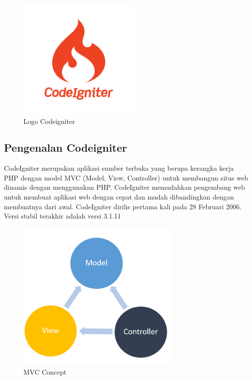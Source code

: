 \begin{enumerate}
\begin{itemize}
\end{itemize}

	\begin{figure}[H]
		\includegraphics[width=6cm]{figures/web/logocodeigniter.png}
		\centering
		\caption{Logo Codeigniter}
	\end{figure}

\subsection{Pengenalan Codeigniter}

CodeIgniter merupakan aplikasi sumber terbuka yang berupa kerangka kerja PHP dengan model MVC (Model, View, Controller) untuk membangun situs web dinamis dengan menggunakan PHP. CodeIgniter memudahkan pengembang web untuk membuat aplikasi web dengan cepat dan mudah dibandingkan dengan membuatnya dari awal. CodeIgniter dirilis pertama kali pada 28 Februari 2006. Versi stabil terakhir adalah versi 3.1.11

	\begin{figure}[H]
		\includegraphics[width=8cm]{figures/web/mvc.png}
		\centering
		\caption{MVC Concept}
	\end{figure}

\end{enumerate}
